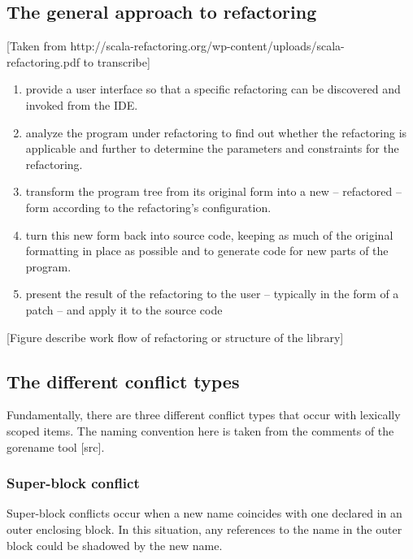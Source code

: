 
\subsection{The general approach to refactoring}
[Taken from http://scala-refactoring.org/wp-content/uploads/scala-refactoring.pdf to transcribe]
\begin{enumerate}
\item provide a user interface so that a specific refactoring can be discovered and
invoked from the IDE.
\item analyze the program under refactoring to find out whether the refactoring is
applicable  and  further  to  determine  the  parameters  and  constraints  for  the
refactoring.
\item transform the program tree from its original form into a new – refactored – form
according to the refactoring’s configuration.
\item turn this new form back into source code,  keeping as much of the original
formatting in place as possible and to generate code for new parts of the program.
\item present the result of the refactoring to the user – typically in the form of a patch –
and apply it to the source code
\end{enumerate}

[Figure describe work flow of refactoring or structure of the library]


\subsection{The different conflict types}
Fundamentally, there are three different conflict types that occur with lexically scoped items. The naming convention here is taken from the comments of the gorename tool [src].

\subsubsection{Super-block conflict}
Super-block conflicts occur when a new name coincides with one declared in an outer enclosing block. In this situation, any references to the name in the outer block could be shadowed by the new name.

